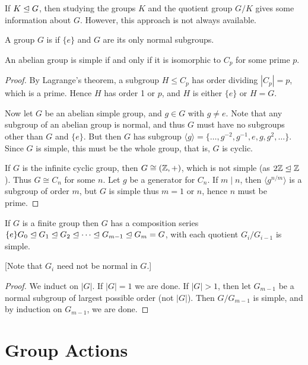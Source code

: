 \documentclass[a4paper]{scrreprt}
\begin{document}
If $K \trianglelefteq G$, then studying the groups $K$ and the quotient group $G/K$ gives some information about $G$. However, this approach is not always available.

\begin{definition}
	A group $G$ is  if $\{e\}$ and $G$ are its only normal subgroups.
\end{definition}

\begin{lemma}
	An abelian group is simple if and only if it is isomorphic to $C_p$ for some prime $p$.
\end{lemma}
\begin{proof}
	By Lagrange's theorem, a subgroup $H \leq C_p$ has order dividing $|C_p| = p$, which is a prime. Hence $H$ has order 1 or $p$, and $H$ is either $\{e\}$ or $H = G$.

	Now let $G$ be an abelian simple group, and $g \in G$ with $g \neq e$. Note that any subgroup of an abelian group is normal, and thus $G$ must have no subgroups other than $G$ and $\{e\}$. But then $G$ has subgroup $\langle g \rangle = \{\dots, g^{-2}, g^{-1}, e, g, g^2, \dots \}$. Since $G$ is simple, this must be the whole group, that is, $G$ is cyclic.

	If $G$ is the infinite cyclic group, then $G \cong (\mathbb{Z}, +)$, which is not simple (as $2 \mathbb{Z} \trianglelefteq \mathbb{Z}$). Thus $G \cong C_n$ for some $n$. Let $g$ be a generator for $C_n$. If $m \mid n$, then $\langle g^{n/m} \rangle$ is a subgroup of order $m$, but $G$ is simple thus $m = 1$ or $n$, hence $n$ must be prime.
\end{proof}

\begin{lemma}
	If $G$ is a finite group then $G$ has a composition series $\{e\} G_0 \trianglelefteq G_1 \trianglelefteq G_2 \trianglelefteq \cdots \trianglelefteq G_{m- 1} \trianglelefteq G_m = G$, with each quotient $G_i / G_{i - 1}$ is simple.

	[Note that $G_i$ need not be normal in $G$.]
\end{lemma}
\begin{proof}
	We induct on $|G|$. If $|G| = 1$ we are done. If $|G| > 1$, then let $G_{m - 1}$ be a normal subgroup of largest possible order (not $|G|$). Then $G/G_{m - 1}$ is simple, and by induction on $G_{m - 1}$, we are done.
\end{proof}


\chapter{Group Actions}
\end{document}
